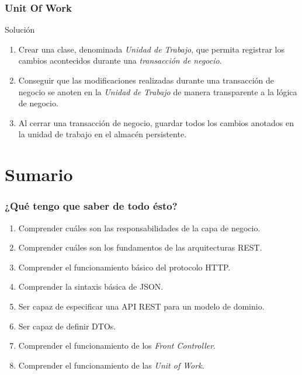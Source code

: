 \documentclass[a4paper,slidestop,xcolor=pst,blue]{beamer}
\begin{document}
\begin{frame}[c]
    \frametitle{Unit Of Work}
    \begin{block}{Solución}
        \begin{enumerate}
            \item<1-> Crear una clase, denominada \emph{Unidad de Trabajo}, que permita registrar los cambios acontecidos durante una \emph{transacción de negocio}.
            \item<2-> Conseguir que las modificaciones realizadas durante una transacción de negocio se anoten en la \emph{Unidad de Trabajo} de manera transparente a la lógica de negocio. 
            \item<3-> Al cerrar una transacción de negocio, guardar todos los cambios anotados en la unidad de trabajo en el almacén persistente.
        \end{enumerate}
    \end{block}
\end{frame}


\section{Sumario}

\begin{frame}[c]
    \frametitle{¿Qué tengo que saber de todo ésto?}
    \begin{enumerate}[<+->]
        \item Comprender cuáles son las responsabilidades de la capa de negocio.
        \item Comprender cuáles son los fundamentos de las arquitecturas REST.
        \item Comprender el funcionamiento básico del protocolo HTTP.
        \item Comprender la sintaxis básica de JSON.
        \item Ser capaz de especificar una API REST para un modelo de dominio.
        \item Ser capaz de definir DTOs.
        \item Comprender el funcionamiento de los \emph{Front Controller}.
        \item Comprender el funcionamiento de las \emph{Unit of Work}. 
    \end{enumerate}
\end{frame}
\end{document}
